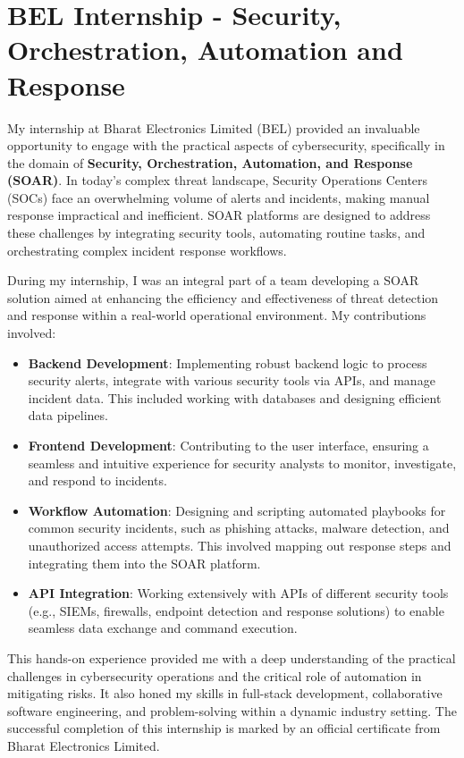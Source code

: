 \section{BEL Internship - Security, Orchestration, Automation and Response}
My internship at Bharat Electronics Limited (BEL) provided an invaluable opportunity to engage with the practical aspects of cybersecurity, specifically in the domain of \textbf{Security, Orchestration, Automation, and Response (SOAR)}. In today's complex threat landscape, Security Operations Centers (SOCs) face an overwhelming volume of alerts and incidents, making manual response impractical and inefficient. SOAR platforms are designed to address these challenges by integrating security tools, automating routine tasks, and orchestrating complex incident response workflows.

During my internship, I was an integral part of a team developing a SOAR solution aimed at enhancing the efficiency and effectiveness of threat detection and response within a real-world operational environment. My contributions involved:
\begin{itemize}
    \item \textbf{Backend Development}: Implementing robust backend logic to process security alerts, integrate with various security tools via APIs, and manage incident data. This included working with databases and designing efficient data pipelines.
    \item \textbf{Frontend Development}: Contributing to the user interface, ensuring a seamless and intuitive experience for security analysts to monitor, investigate, and respond to incidents.
    \item \textbf{Workflow Automation}: Designing and scripting automated playbooks for common security incidents, such as phishing attacks, malware detection, and unauthorized access attempts. This involved mapping out response steps and integrating them into the SOAR platform.
    \item \textbf{API Integration}: Working extensively with APIs of different security tools (e.g., SIEMs, firewalls, endpoint detection and response solutions) to enable seamless data exchange and command execution.
\end{itemize}
This hands-on experience provided me with a deep understanding of the practical challenges in cybersecurity operations and the critical role of automation in mitigating risks. It also honed my skills in full-stack development, collaborative software engineering, and problem-solving within a dynamic industry setting. The successful completion of this internship is marked by an official certificate from Bharat Electronics Limited.